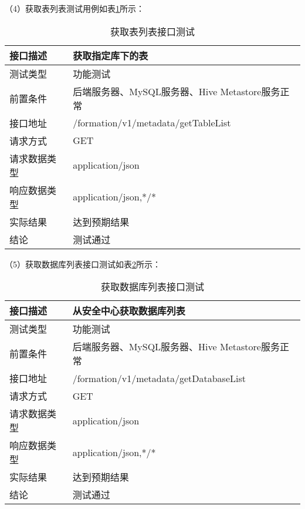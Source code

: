 （4）获取表列表测试用例如表\ref{tab:exampletable7}所示：

\begin{table}[H]
  \centering
  \caption{获取表列表接口测试}
  \label{tab:exampletable7}
  \begin{tabular}{ll}
    \toprule
    接口描述         & 获取指定库下的表         \\
    \midrule
    测试类型         & 功能测试         \\
    前置条件         & 后端服务器、MySQL服务器、Hive Metastore服务正常         \\
    接口地址       & /formation/v1/metadata/getTableList        \\
    请求方式         & GET      \\
    请求数据类型         & application/json     \\
    响应数据类型         & application/json,*/*           \\
    实际结果         & 达到预期结果           \\
    结论            & 测试通过           \\
    \bottomrule
  \end{tabular}
\end{table}

（5）获取数据库列表接口测试如表\ref{tab:exampletable8}所示：

\begin{table}[H]
  \centering
  \caption{获取数据库列表接口测试}
  \label{tab:exampletable8}
  \begin{tabular}{ll}
    \toprule
    接口描述         & 从安全中心获取数据库列表         \\
    \midrule
    测试类型         & 功能测试         \\
    前置条件         & 后端服务器、MySQL服务器、Hive Metastore服务正常         \\
    接口地址       & /formation/v1/metadata/getDatabaseList        \\
    请求方式         & GET      \\
    请求数据类型         & application/json     \\
    响应数据类型         & application/json,*/*           \\
    实际结果         & 达到预期结果           \\
    结论            & 测试通过           \\
    \bottomrule
  \end{tabular}
\end{table}

